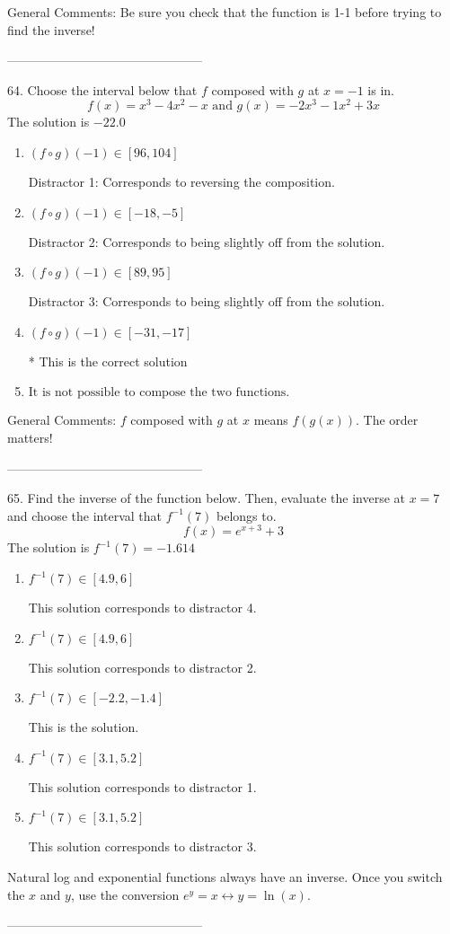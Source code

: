 \documentclass{article}[14pt]
\begin{document}
General Comments: Be sure you check that the function is 1-1 before trying to find the inverse!

-----------------------------------------------

64. Choose the interval below that $f$ composed with $g$ at $x=-1$ is in.
$$ f(x) = x^{3} -4 x^{2} -x \text{ and } g(x) = -2x^{3} -1 x^{2} +3 x $$ 
The solution is $ -22.0 $ 

\begin{enumerate}[label=\Alph*.] 
\item $ (f \circ g)(-1) \in [96, 104] $ 

  Distractor 1: Corresponds to reversing the composition. 
\item $ (f \circ g)(-1) \in [-18, -5] $ 

  Distractor 2: Corresponds to being slightly off from the solution. 
\item $ (f \circ g)(-1) \in [89, 95] $ 

  Distractor 3: Corresponds to being slightly off from the solution. 
\item $ (f \circ g)(-1) \in [-31, -17] $ 

 * This is the correct solution 
\item $ \text{It is not possible to compose the two functions.} $ 

  
\end{enumerate} 
 
General Comments: $f$ composed with $g$ at $x$ means $f(g(x))$. The order matters!

-----------------------------------------------

65. Find the inverse of the function below. Then, evaluate the inverse at $x = 7$ and choose the interval that $f^{-1}(7)$ belongs to.
$$ f(x) = e^{x+3}+3 $$ 
The solution is $ f^{-1}(7) = -1.614 $ 

\begin{enumerate}[label=\Alph*.] 
\item $ f^{-1}(7) \in [4.9, 6] $ 

  This solution corresponds to distractor 4. 
\item $ f^{-1}(7) \in [4.9, 6] $ 

  This solution corresponds to distractor 2. 
\item $ f^{-1}(7) \in [-2.2, -1.4] $ 

  This is the solution. 
\item $ f^{-1}(7) \in [3.1, 5.2] $ 

  This solution corresponds to distractor 1. 
\item $ f^{-1}(7) \in [3.1, 5.2] $ 

  This solution corresponds to distractor 3. 
\end{enumerate} 
 
Natural log and exponential functions always have an inverse. Once you switch the $x$ and $y$, use the conversion $ e^y = x \leftrightarrow y=\ln(x)$.

-----------------------------------------------
\end{document}

